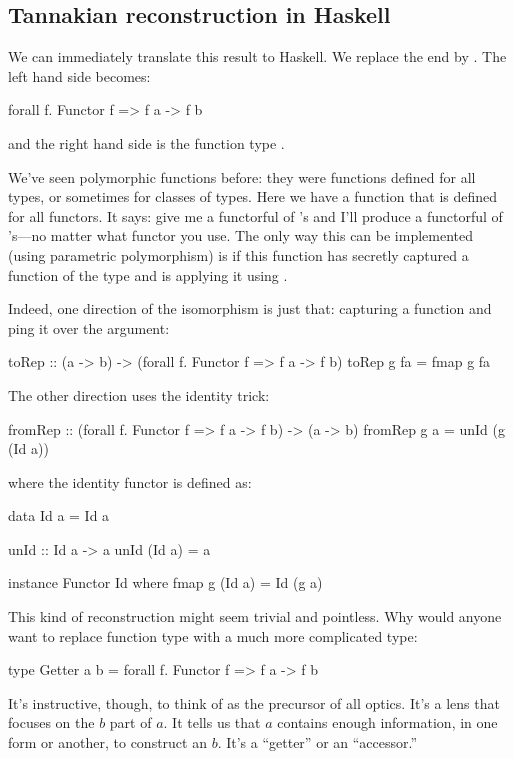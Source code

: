 \documentclass[DaoFP]{subfiles}
\begin{document}
\subsection{Tannakian reconstruction in Haskell}

We can immediately translate this result to Haskell. We replace the end by . The left hand side becomes:
\begin{haskell}
forall f. Functor f => f a -> f b
\end{haskell}
and the right hand side is the function type . 

We've seen polymorphic functions before: they were functions defined for all types, or sometimes for classes of types. Here we have a function that is defined for all functors. It says: give me a functorful of 's and I'll produce a functorful of 's---no matter what functor you use. The only way this can be implemented (using parametric polymorphism) is if this function has secretly captured a function of the type  and is applying it using . 

Indeed, one direction of the isomorphism is just that: capturing a function and ping it over the argument:
\begin{haskell}
toRep :: (a -> b) -> (forall f. Functor f => f a -> f b)
toRep g fa = fmap g fa
\end{haskell}
The other direction uses the identity trick:
\begin{haskell}
fromRep :: (forall f. Functor f => f a -> f b) -> (a -> b)
fromRep g a = unId (g (Id a))
\end{haskell}
where the identity functor is defined as:
\begin{haskell}
data Id a = Id a 
  
unId :: Id a -> a
unId (Id a) = a

instance Functor Id where
  fmap g (Id a) = Id (g a)
\end{haskell}

This kind of reconstruction might seem trivial and pointless. Why would anyone want to replace function type  with a much more complicated type:
\begin{haskell}
type Getter a b = forall f. Functor f => f a -> f b
\end{haskell}
It's instructive, though, to think of  as the precursor of all optics. It's a lens that focuses on the $b$ part of $a$. It tells us that $a$ contains enough information, in one form or another, to construct an $b$. It's a ``getter'' or an ``accessor.'' 
\end{document}
